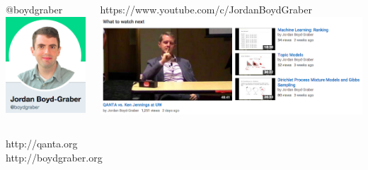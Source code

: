 \documentclass[aspectratio=169,xcolor=dvipsnames]{beamer}
\begin{document}
\begin{frame}[plain]

\begin{columns}
        \begin{center}
          @boydgraber
          \includegraphics[width=0.6\linewidth]{general_figures/twitter}
          \\
          \end{center}

  \begin{center}
    https://www.youtube.com/c/JordanBoydGraber
    \includegraphics[width=1.0\linewidth]{general_figures/youtube} \\

\end{center}

\end{columns}

\begin{center}
\huge
http://qanta.org \\
http://boydgraber.org
       \end{center}


\end{frame}
\end{document}
